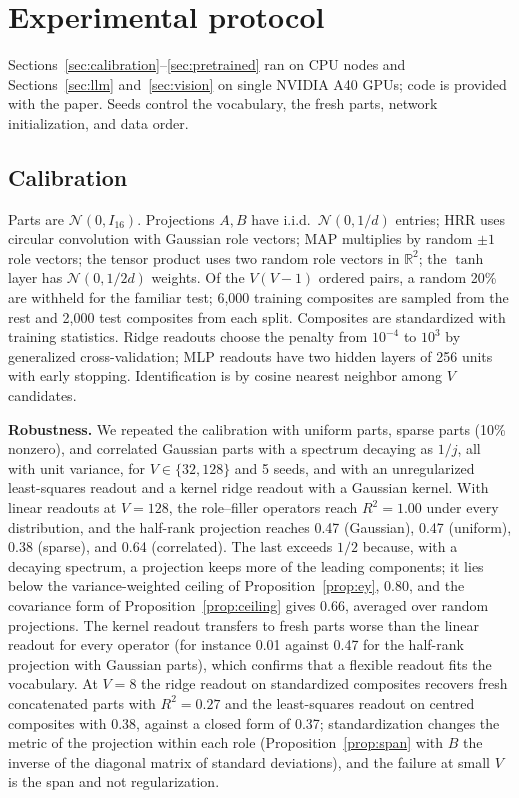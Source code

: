 \documentclass[10pt]{article}
\theoremstyle{plain}
\theoremstyle{remark}
\newcommand{\R}{\mathbb{R}}
\begin{document}
\section{Experimental protocol}
\label{app:protocol}

Sections~\ref{sec:calibration}--\ref{sec:pretrained} ran on CPU nodes and Sections~\ref{sec:llm} and~\ref{sec:vision} on single NVIDIA A40 GPUs; code is provided with the paper. Seeds control the vocabulary, the fresh parts, network initialization, and data order.

\subsection{Calibration}
Parts are $\mathcal{N}(0, I_{16})$. Projections $A, B$ have i.i.d.\ $\mathcal{N}(0, 1/d)$ entries; HRR uses circular convolution with Gaussian role vectors; MAP multiplies by random $\pm 1$ role vectors; the tensor product uses two random role vectors in $\R^2$; the $\tanh$ layer has $\mathcal{N}(0, 1/2d)$ weights. Of the $V(V-1)$ ordered pairs, a random 20\% are withheld for the familiar test; 6{,}000 training composites are sampled from the rest and 2{,}000 test composites from each split. Composites are standardized with training statistics. Ridge readouts choose the penalty from $10^{-4}$ to $10^{3}$ by generalized cross-validation; MLP readouts have two hidden layers of 256 units with early stopping. Identification is by cosine nearest neighbor among $V$ candidates.

\textbf{Robustness.} We repeated the calibration with uniform parts, sparse parts (10\% nonzero), and correlated Gaussian parts with a spectrum decaying as $1/j$, all with unit variance, for $V \in \{32, 128\}$ and 5 seeds, and with an unregularized least-squares readout and a kernel ridge readout with a Gaussian kernel. With linear readouts at $V = 128$, the role--filler operators reach $R^2 = 1.00$ under every distribution, and the half-rank projection reaches 0.47 (Gaussian), 0.47 (uniform), 0.38 (sparse), and 0.64 (correlated). The last exceeds $1/2$ because, with a decaying spectrum, a projection keeps more of the leading components; it lies below the variance-weighted ceiling of Proposition~\ref{prop:ey}, 0.80, and the covariance form of Proposition~\ref{prop:ceiling} gives 0.66, averaged over random projections. The kernel readout transfers to fresh parts worse than the linear readout for every operator (for instance 0.01 against 0.47 for the half-rank projection with Gaussian parts), which confirms that a flexible readout fits the vocabulary. At $V = 8$ the ridge readout on standardized composites recovers fresh concatenated parts with $R^2 = 0.27$ and the least-squares readout on centred composites with 0.38, against a closed form of 0.37; standardization changes the metric of the projection within each role (Proposition~\ref{prop:span} with $B$ the inverse of the diagonal matrix of standard deviations), and the failure at small $V$ is the span and not regularization.
\end{document}
